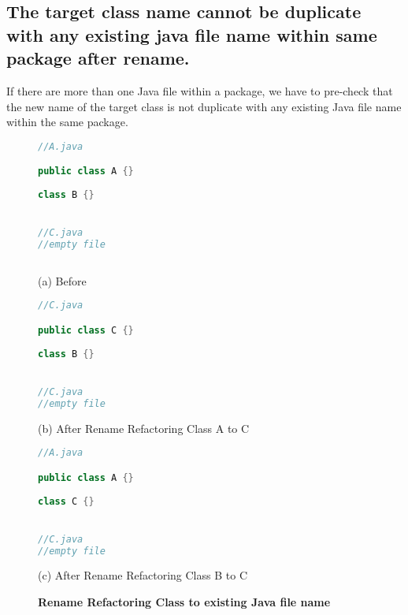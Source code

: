 \subsection{The target class name cannot be duplicate with any existing java file name within same package after rename.}

If there are more than one Java file within a package, we have to pre-check that the new name of the target class is not duplicate with any existing Java file name within the same package. 

\begin{figure}[th]
\centering
\begin{minipage}[t]{0.45\linewidth}
\begin{lstlisting}[language=java, basicstyle=\scriptsize\ttfamily,frame=single]
//A.java

public class A {}
	
class B {}


//C.java
//empty file
 
\end{lstlisting}
\centering(a) Before 
\end{minipage}
\hfill
\begin{minipage}[t]{0.45\linewidth}
\begin{lstlisting}[language=java, basicstyle=\scriptsize\ttfamily,frame=single]
//C.java

public class C {}
	
class B {}


//C.java
//empty file

\end{lstlisting}
\centering(b) After Rename Refactoring Class A to C
\end{minipage}

\centering
\begin{minipage}[t]{0.45\linewidth}
\begin{lstlisting}[language=java, basicstyle=\scriptsize\ttfamily,frame=single]
//A.java

public class A {}
	
class C {}


//C.java
//empty file

\end{lstlisting}
\centering(c) After Rename Refactoring Class B to C
\end{minipage}
\caption{\textbf{Rename Refactoring Class to existing Java file name}}
\label{figure:classFileName}
\end{figure}

